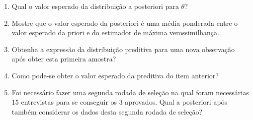 \documentclass[11pt,a4]{article}\usepackage[]{graphicx}\usepackage[]{xcolor}
\begin{document}
\begin{enumerate}
\begin{enumerate}
  \item Qual o valor esperado da distribuição a posteriori para $\theta$?
  \item Mostre que o valor esperado da posteriori é uma média ponderada entre o valor esperado da priori e do estimador de máxima verossimilhança. 
  \item Obtenha a expressão da distribuição preditiva para uma nova observação após obter esta primeira amostra?
  \item Como pode-se obter o valor esperado da preditiva do item anterior?
  \item Foi necessário fazer uma segunda rodada de seleção na qual foram necessárias 15 entrevistas para se conseguir os 3 aprovados. Qual a posteriori após também considerar os dados desta segunda rodada de seleção? 
  \end{enumerate}

\end{enumerate}
\end{document}
